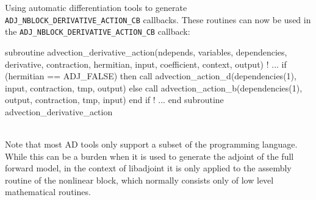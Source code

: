 \begin{boxwithtitle}{Using automatic differentiation tools to generate \texttt{ADJ_NBLOCK_DERIVATIVE_ACTION_CB} callbacks.}
These routines can now be used in the \texttt{ADJ_NBLOCK_DERIVATIVE_ACTION_CB} callback:
\\

\begin{minipage}{\columnwidth}
\begin{fortrancode}
  subroutine advection_derivative_action(ndepends, variables, dependencies, 
                                         derivative, contraction, hermitian, 
                                         input, coefficient, context, output)
    ! ...
    if (hermitian == ADJ_FALSE) then
      call advection_action_d(dependencies(1), input, contraction, tmp, output)
    else
      call advection_action_b(dependencies(1), output, contraction, tmp, input)
    end if
    ! ...
  end subroutine advection_derivative_action
\end{fortrancode}
\end{minipage}
\\

Note that most AD tools only support a subset of the programming language. 
While this can be a burden when it is used to generate the adjoint of the full forward model,
in the context of libadjoint it is only applied to the assembly routine of the nonlinear block, which normally consists only of low level mathematical routines.
 
\end{boxwithtitle}

